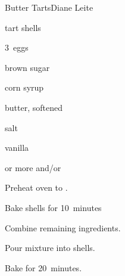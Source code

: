 \begin{recipe}{Butter Tarts}{Diane Leite}{}

\begin{ingredients}
\item tart shells
\item 3~eggs
\item {} brown sugar
\item \C{\half} corn syrup
\item \C{\quarter} butter, softened
\item \tp{\half} salt
\item {} vanilla
\item {} or more  and/or 
\end{ingredients}

\begin{directions}
\item Preheat oven to .
\item Bake shells for 10~minutes
\item Combine remaining ingredients.
\item Pour mixture into shells.
\item Bake for 20~minutes.
\end{directions}

\end{recipe}
